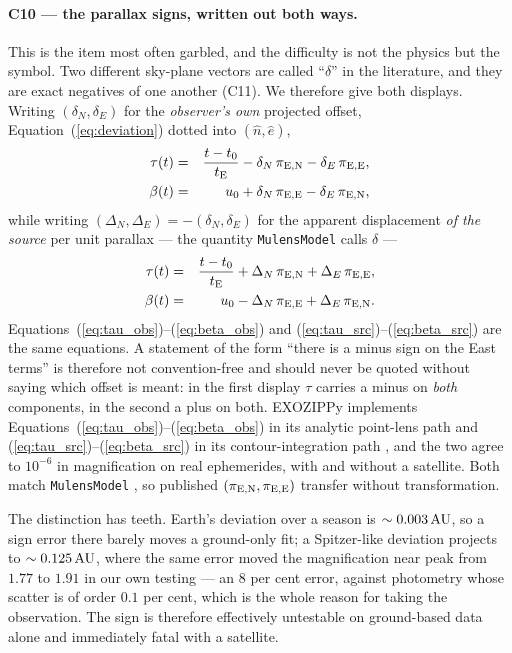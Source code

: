 \paragraph{C10 --- the parallax signs, written out both ways.}  This is the
item most often garbled, and the difficulty is not the physics but the
symbol.  Two different sky-plane vectors are called ``$\delta$'' in the
literature, and they are exact negatives of one another (C11).  We therefore
give both displays.  Writing $(\delta_N, \delta_E)$ for the
\emph{observer's own} projected offset, Equation~(\ref{eq:deviation})
dotted into $(\hat{n}, \hat{e})$,
\begin{eqnarray}
  \tau(t) &=& \frac{t-t_0}{t_{\rm E}}
              - \delta_N\,\pi_{\rm E,N} - \delta_E\,\pi_{\rm E,E},
              \label{eq:tau_obs} \\
  \beta(t) &=& u_0
              + \delta_N\,\pi_{\rm E,E} - \delta_E\,\pi_{\rm E,N},
              \label{eq:beta_obs}
\end{eqnarray}
while writing $(\Delta_N, \Delta_E) = -(\delta_N, \delta_E)$ for the
apparent displacement \emph{of the source} per unit parallax --- the
quantity \texttt{MulensModel} calls $\delta$ ---
\begin{eqnarray}
  \tau(t) &=& \frac{t-t_0}{t_{\rm E}}
              + \Delta_N\,\pi_{\rm E,N} + \Delta_E\,\pi_{\rm E,E},
              \label{eq:tau_src} \\
  \beta(t) &=& u_0
              - \Delta_N\,\pi_{\rm E,E} + \Delta_E\,\pi_{\rm E,N}.
              \label{eq:beta_src}
\end{eqnarray}
Equations~(\ref{eq:tau_obs})--(\ref{eq:beta_obs}) and
(\ref{eq:tau_src})--(\ref{eq:beta_src}) are the same equations.  A statement
of the form ``there is a minus sign on the East terms'' is therefore not
convention-free and should never be quoted without saying which offset is
meant: in the first display $\tau$ carries a minus on \emph{both}
components, in the second a plus on both.  EXOZIPPy implements
Equations~(\ref{eq:tau_obs})--(\ref{eq:beta_obs}) in its analytic
point-lens path and (\ref{eq:tau_src})--(\ref{eq:beta_src}) in its
contour-integration path \citep{Bozza:2018, Bozza:2025}, and the two agree
to $10^{-6}$ in magnification on real ephemerides, with and without a
satellite.  Both match \texttt{MulensModel} \citep{Poleski:2019}, so
published $(\pi_{\rm E,N}, \pi_{\rm E,E})$ transfer without transformation.

The distinction has teeth.  Earth's deviation over a season is
$\sim 0.003\,{\rm AU}$, so a sign error there barely moves a ground-only
fit; a Spitzer-like deviation projects to $\sim 0.125\,{\rm AU}$, where the
same error moved the magnification near peak from $1.77$ to $1.91$ in our
own testing --- an $8$ per cent error, against photometry whose scatter is
of order $0.1$ per cent, which is the whole reason for taking the
observation.  The sign is therefore effectively untestable on ground-based
data alone and immediately fatal with a satellite.

